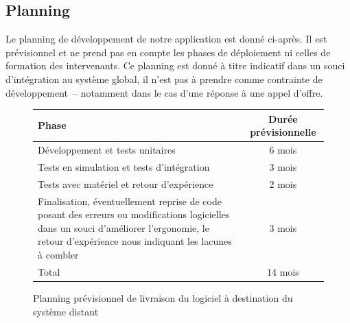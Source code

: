 \documentclass[a4paper, 11pt, final]{article}
\begin{document}
\pagebreak

\subsection{Planning}
Le planning de développement de notre application est donné ci-après. Il est prévisionnel et ne prend pas en compte les phases de déploiement ni celles de formation des intervenants. Ce planning est donné à titre indicatif dans un souci d'intégration au système global, il n'est pas à prendre comme contrainte de développement~-- notamment dans le cas d'une réponse à une appel d'offre.

\begin{figure}[h!]
\begin{center}
\begin{tabular}{|p{9cm}|c|}
\hline
Phase & Durée prévisionnelle\\ \hline \hline
Développement et tests unitaires & 6 mois\\ \hline
Tests en simulation et tests d'intégration & 3 mois\\ \hline
Tests avec matériel et retour d'expérience & 2 mois\\ \hline
Finalisation, éventuellement reprise de code posant des erreurs ou modifications logicielles dans un souci d'améliorer l'ergonomie, le retour d'expérience nous indiquant les lacunes à combler & 3 mois\\ \hline
Total & 14 mois\\ \hline
\end{tabular}
\end{center}
\caption{Planning prévisionnel de livraison du logiciel à destination du système distant}
\end{figure}
\FloatBarrier





\end{document}
